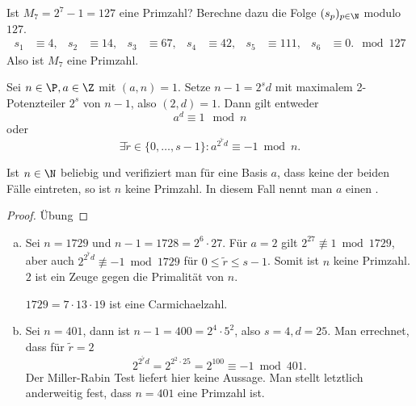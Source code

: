 \begin{ex} \label{3.18}
	Ist $M_7 = 2^7 - 1 = 127$ eine Primzahl?
	Berechne dazu die Folge $(s_p)_{p\in \N}$ modulo $127$.
	\begin{align*}
		s_1 &\equiv 4, &
		s_2 &\equiv 14, &
		s_3 &\equiv 67, &
		s_4 &\equiv 42, &
		s_5 &\equiv 111, &
		s_6 &\equiv 0.
		\mod 127
	\end{align*}
	Also ist $M_7$ eine Primzahl.
\end{ex}

\begin{prop} \label{3.19}
	Sei $n \in \P, a \in \Z$ mit $(a, n) = 1$.
	Setze $n - 1 = 2^s d$ mit maximalem 2-Potenzteiler $2^s$ von $n-1$, also $(2, d) = 1$.
	Dann gilt entweder
	\[
		a^d \equiv 1 \mod n
	\]
	oder
	\[
		\exists \tilde r \in \{0, \dotsc, s-1\} :
		a^{2^{\tilde r} d} \equiv -1 \bmod n.
	\]
	\begin{note}
		Ist $n \in \N$ beliebig und verifiziert man für eine Basis $a$, dass keine der beiden Fälle eintreten, so ist $n$ keine Primzahl.
		In diesem Fall nennt man $a$ einen .
	\end{note}
	\begin{proof}
		Übung
	\end{proof}
\end{prop}


\begin{ex} \label{3.20}
	\begin{enumerate}[a)]
		\item
			Sei $n = 1729$ und $n - 1 = 1728 = 2^6 \cdot 27$.
			Für $a = 2$ gilt $2^{27} \not\equiv 1 \bmod 1729$, aber auch $2^{2^{\tilde r} d} \not\equiv -1 \bmod 1729$ für $0 \le \tilde r \le s-1$.
			Somit ist $n$ keine Primzahl.
			$2$ ist ein Zeuge gegen die Primalität von $n$.

			$1729 = 7 \cdot 13 \cdot 19$ ist eine Carmichaelzahl.
		\item
			Sei $n = 401$, dann ist $n - 1 = 400 = 2^4 \cdot 5^2$, also $s = 4, d = 25$.
			Man errechnet, dass für $\tilde r = 2$
			\[
				2^{2^{\tilde r} d} = 2^{2^2 \cdot 25} = 2^{100} \equiv -1 \bmod 401.
			\]
			Der Miller-Rabin Test liefert hier keine Aussage.
			Man stellt letztlich anderweitig fest, dass $n = 401$ eine Primzahl ist.
	\end{enumerate}
\end{ex}

